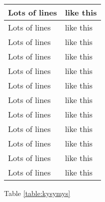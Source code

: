 \begin{longtable}[l]{| p{40mm} | p{105mm} |}
    \hline
    Lots of lines & like this\\
    \hline
    Lots of lines & like this\\
    \hline
    Lots of lines & like this\\
    \hline
    Lots of lines & like this\\
    \hline
    Lots of lines & like this\\
    \hline
    Lots of lines & like this\\
    \hline
    Lots of lines & like this\\
    \hline
    Lots of lines & like this\\
    \hline
    Lots of lines & like this\\
    \hline
    Lots of lines & like this\\
    \hline
    Lots of lines & like this\\
    \hline
    Lots of lines & like this\\
    \hline
\end{longtable}

Table \ref{table:kysymys}